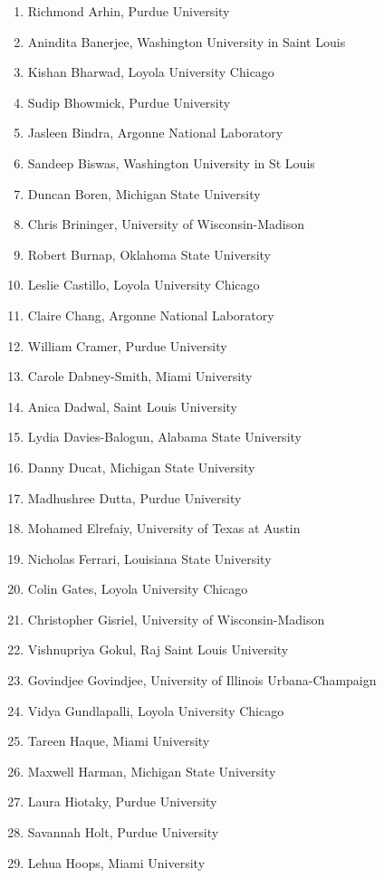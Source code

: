 \begin{multicols}{2}
	\begin{enumerate}
\item Richmond	Arhin,	Purdue University
\item Anindita	Banerjee,	Washington University in Saint Louis
\item Kishan	Bharwad,	Loyola University Chicago
\item Sudip	Bhowmick,	Purdue University
\item Jasleen	Bindra,	Argonne National Laboratory
\item Sandeep	Biswas,	Washington University in St Louis
\item Duncan 	Boren,	Michigan State University
\item Chris	Brininger,	University of Wisconsin-Madison
\item Robert	Burnap,	Oklahoma State University
\item Leslie 	Castillo,	Loyola University Chicago
\item Claire	Chang,	Argonne National Laboratory
\item William	Cramer,	Purdue University
\item Carole	Dabney-Smith,	Miami University
\item Anica	Dadwal,	Saint Louis University
\item Lydia	Davies-Balogun,	Alabama State University 
\item Danny	Ducat,	Michigan State University
\item Madhushree	Dutta,	Purdue University 
\item Mohamed	Elrefaiy,	University of Texas at Austin
\item Nicholas	Ferrari,	Louisiana State University
\item Colin	Gates,	Loyola University Chicago
\item Christopher	Gisriel,	University of Wisconsin-Madison
\item Vishnupriya	Gokul, Raj	Saint Louis University
\item Govindjee	Govindjee,	University of Illinois Urbana-Champaign
\item Vidya	Gundlapalli,	Loyola University Chicago
\item Tareen	Haque,	Miami University
\item Maxwell	Harman,	Michigan State University
\item Laura	Hiotaky,	Purdue University
\item Savannah	Holt,	Purdue University 
\item Lehua	Hoops,	Miami University

\end{enumerate}
\end{multicols}
